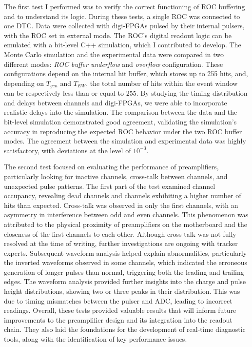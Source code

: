 The first test I performed was to verify the correct functioning of 
ROC buffering and to understand its logic. During these tests, a single 
ROC was connected to one DTC. Data were collected with digi-FPGAs pulsed 
by their internal pulsers, with the ROC set in external mode. The ROC's digital 
readout logic can be emulated with a bit-level C++ simulation, which I 
contributed to develop. The Monte Carlo simulation and the experimental 
data were compared in two different modes: \textit{ROC buffer underflow} and \textit{overflow} 
configuration. These configurations depend on the internal hit buffer, which stores up to 255 hits, 
and, depending on \( T_{gen} \) and \( T_{EW} \), the total number of hits within the event window can be respectively 
less than or equal to 255. 
By studying the timing distribution and delays between channels and digi-FPGAs, we 
were able to incorporate realistic delays into the simulation. The comparison 
between the data and the bit-level simulation demonstrated good agreement, 
validating the simulation's accuracy in reproducing the expected ROC behavior under 
the two ROC buffer modes. The agreement between the simulation and 
experimental data was highly satisfactory, with deviations at the level of \( 10^{-3} \).

The second test focused on evaluating the performance of preamplifiers, 
particularly looking for inactive channels, cross-talk between channels, 
and unexpected pulse patterns. The first part of the test examined channel occupancy, revealing 
dead channels and channels exhibiting a higher number of hits than expected. 
Cross-talk was observed in only the first channels, with an asymmetry in interference 
between odd and even channels. This phenomenon was attributed to the physical proximity 
of preamplifiers on the motherboard and the closeness of the first channels to each other. 
Although cross-talk was not fully resolved at the time of writing, further investigations 
are ongoing with tracker experts.
Subsequent waveform analysis helped explain abnormalities, particularly the inverted 
waveforms observed in some channels, which indicated the erroneous generation of longer 
pulses than normal, triggering both the leading and trailing edges. The waveform analysis 
provided further insights into the charge and pulse height distributions, showing two or 
three peaks in their distribution. This was due to timing mismatches between the pulser 
and ADC, leading to incorrect readings. Overall, these tests provided valuable results 
that will inform future improvements to the preamplifier design and its integration into 
the readout chain. They also laid the foundations for the development of real-time 
diagnostic tools, along with the identification of key performance issues.

